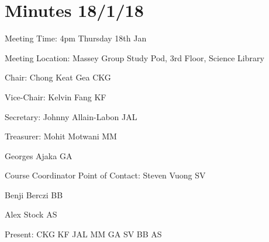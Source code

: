 
\noindent 
\section{Minutes 18/1/18}\label{app:18-1}

\noindent Meeting Time: 4pm Thursday 18th Jan

\noindent Meeting Location: Massey Group Study Pod, 3rd Floor, Science Library\textbf{}\\

\noindent 

\noindent \textbf{}

\noindent Chair: Chong Keat Gea CKG

\noindent Vice-Chair: Kelvin Fang KF

\noindent Secretary: Johnny Allain-Labon JAL

\noindent Treasurer: Mohit Motwani MM

\noindent Georges Ajaka GA

\noindent Course Coordinator Point of Contact: Steven Vuong SV

\noindent Benji Berczi BB

\noindent Alex Stock AS

\noindent 

\noindent Present: CKG KF JAL MM GA SV BB AS\\

\noindent 

